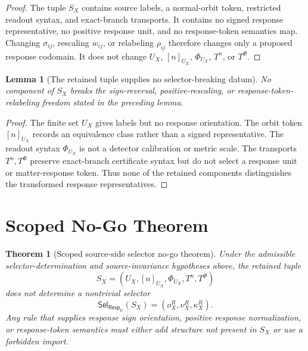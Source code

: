 \documentclass[11pt]{article}
\newcommand{\RespLC}{\mathsf{Resp}_{\mathrm{lc}}}
\newcommand{\SelResp}{\mathsf{Sel}_{\RespLC}}
\newtheorem{lemma}{Lemma}
\newtheorem{theorem}{Theorem}
\begin{document}
\begin{proof}
The tuple \(S_X\) contains source labels, a normal-orbit token,
restricted readout syntax, and exact-branch transports. It contains no
signed response representative, no positive response unit, and no
response-token semantics map. Changing \(\sigma_{ij}\), rescaling
\(w_{ij}\), or relabeling \(\rho_{ij}\) therefore changes only a
proposed response codomain. It does not change \(U_X\),
\([n]_{U_X}\), \(\Phi_{U_X}\), \(T^n\), or \(T^\Phi\).
\end{proof}

\begin{lemma}[The retained tuple supplies no selector-breaking datum]
No component of \(S_X\) breaks the sign-reversal, positive-rescaling,
or response-token-relabeling freedom stated in the preceding lemma.
\end{lemma}

\begin{proof}
The finite set \(U_X\) gives labels but no response orientation.
The orbit token \([n]_{U_X}\) records an equivalence class rather than
a signed representative. The readout syntax \(\Phi_{U_X}\) is not a
detector calibration or metric scale. The transports \(T^n,T^\Phi\)
preserve exact-branch certificate syntax but do not select a response
unit or matter-response token. Thus none of the retained components
distinguishes the transformed response representatives.
\end{proof}

\section{Scoped No-Go Theorem}

\begin{theorem}[Scoped source-side selector no-go theorem]
Under the admissible selector-determination and source-invariance
hypotheses above, the retained tuple
\[
    S_X=(U_X,[n]_{U_X},\Phi_{U_X},T^n,T^\Phi)
\]
does not determine a nontrivial selector
\[
    \SelResp(S_X)=(o^R_X,\nu^R_X,\kappa^R_X).
\]
Any rule that supplies response sign orientation, positive response
normalization, or response-token semantics must either add structure
not present in \(S_X\) or use a forbidden import.
\end{theorem}
\end{document}
